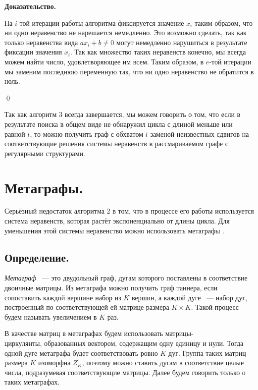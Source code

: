 \documentclass[14pt]{mmcs_article}
\begin{document}
\textbf{Доказательство.}

На $i$-той итерации работы алгоритма фиксируется значение $x_i$ таким образом, что ни одно неравенство не нарешается немедленно. Это возможно сделать, так как только неравенства вида $ax_i + b \neq 0$ могут немедленно нарушиться в результате фиксации значения $x_i$. Так как множество таких неравенств конечно, мы всегда можем найти число, удовлетворяющее им всем. Таким образом, в $e$-той итерации мы заменим последнюю переменную так, что ни одно неравенство не обратится в ноль. 

\qed

Так как алгоритм 3 всегда завершается, мы можем говорить о том, что если в результате поиска в общем виде не обнаружил цикла с длиной меньше или равной $t$, то можно получить граф с обхватом $t$ заменой неизвестных сдвигов на соответствующие решения системы неравенств в рассмариваемом графе с регулярными структурами.

\newpage
\section{Метаграфы.}

Серьёзный недостаток алгоритма 2 в том, что в процессе его работы используется система неравенств, которая растёт экспоненциально от длины цикла. Для уменьшения этой системы неравенство можно использовать метаграфы \cite{metagraphs}.

\subsection{Определение.}

\textsl{Метаграф} ~--- это двудольный граф, дугам которого поставлены в соответствие двоичные матрицы. Из метаграфа можно получить граф таннера, если сопоставить каждой вершине набор из $K$ вершин, а каждой дуге ~--- набор дуг, построенный по соответствующей ей матрице размера $K \times K$. Такой процесс будем называть увеличением в $K$ раз. 

В качестве матриц в метаграфах будем использовать матрицы-\\циркулянты, образованных вектором, содержащим одну единицу и нули. Тогда одной дуге метаграфа будет соответствовать ровно $K$ дуг. Группа таких матриц размера $K$ изоморфна $Z_K$, поэтому можно ставить дугам в соответствие целые числа, подразумевая соответствующие матрицы. Далее будем говорить только о таких метаграфах.
\end{document}
